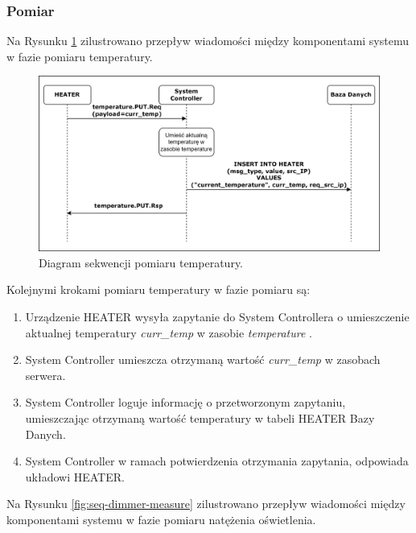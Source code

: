         \subsubsection{Pomiar}

            Na Rysunku \ref{fig:seq-heater-measure} zilustrowano przepływ wiadomości między komponentami systemu w fazie pomiaru temperatury.

            \begin{figure}[H]
                \centering
                \includegraphics[width=0.8\linewidth]{graphics/sequence-diagrams/heater-measure-seq.png}
                \caption{Diagram sekwencji pomiaru temperatury.}
                \label{fig:seq-heater-measure}
            \end{figure}

            Kolejnymi krokami pomiaru temperatury w fazie pomiaru są:
            \begin{enumerate}
                \item Urządzenie HEATER wysyła zapytanie do System Controllera o umieszczenie aktualnej temperatury \textit{curr\_temp} w zasobie \textit{temperature} .
                \item System Controller umieszcza otrzymaną wartość \textit{curr\_temp} w zasobach serwera.
                \item System Controller loguje informację o przetworzonym zapytaniu, umieszczając otrzymaną wartość temperatury w tabeli HEATER Bazy Danych.
                \item System Controller w ramach potwierdzenia otrzymania zapytania, odpowiada układowi HEATER.
            \end{enumerate}

            Na Rysunku \ref{fig:seq-dimmer-measure} zilustrowano przepływ wiadomości między komponentami systemu w fazie pomiaru natężenia oświetlenia.

